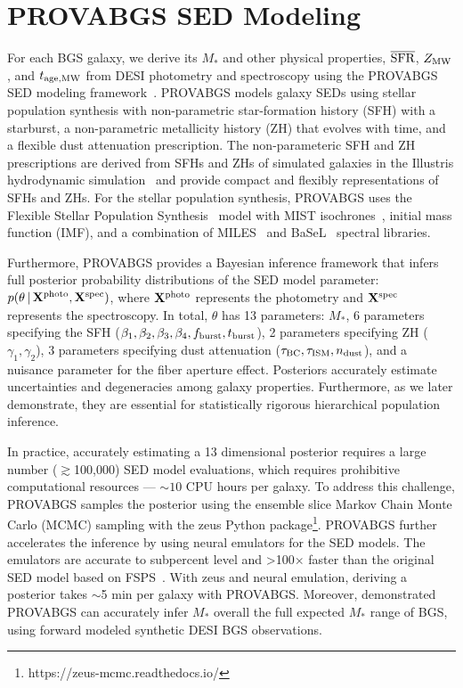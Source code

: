 \section{PROVABGS SED Modeling} \label{sec:provabgs}
For each BGS galaxy, we derive its $M_*$ and other physical properties, 
$\overline{\rm SFR}$, $Z_{\rm MW}$, and $t_{\rm age, MW}$ from DESI
photometry and spectroscopy using the PROVABGS SED modeling
framework~\citep{hahn2022}.  
PROVABGS models galaxy SEDs using stellar population synthesis with
non-parametric star-formation history (SFH) with a starburst, a non-parametric
metallicity history (ZH) that evolves with time, and a flexible dust
attenuation prescription.
The non-parameteric SFH and ZH prescriptions are derived from SFHs and ZHs of
simulated galaxies in the Illustris hydrodynamic
simulation~\citep{vogelsberger2014, genel2014, nelson2015} and provide compact 
and flexibly representations of SFHs and ZHs.
For the stellar population synthesis, PROVABGS uses the Flexible Stellar
Population Synthesis~\citep[FSPS;][]{conroy2009, conroy2010b} model with MIST
isochrones~\citep{paxton2011, paxton2013, paxton2015, choi2016, dotter2016},
\cite{chabrier2003} initial mass function (IMF), and a combination of
MILES~\citep{sanchez-blazquez2006} and BaSeL~\citep{lejeune1997, lejeune1998,
westera2002} spectral libraries.

Furthermore, PROVABGS provides a Bayesian inference framework that infers
full posterior probability distributions of the SED model parameter:
$p(\theta\,|\, {\bf X}^{\rm photo}, {\bf X}^{\rm spec})$, where 
${\bf X}^{\rm photo}$ represents the photometry and ${\bf X}^{\rm spec}$ 
represents the spectroscopy. 
In total, $\theta$ has 13 parameters: $M_*$, 6 parameters specifying the SFH
($\beta_1, \beta_2, \beta_3, \beta_4, f_{\rm burst}, t_{\rm burst}$), 2
parameters specifying ZH ($\gamma_1, \gamma_2$), 3 parameters specifying
dust attenuation ($\tau_{\rm BC}, \tau_{\rm ISM}, n_{\rm dust}$), and a
nuisance parameter for the fiber aperture effect. 
Posteriors accurately estimate uncertainties and degeneracies among galaxy
properties. 
Furthermore, as we later demonstrate, they are essential for statistically
rigorous hierarchical population inference.

In practice, accurately estimating a 13 dimensional posterior requires a large
number ($\gtrsim$100,000) SED model evaluations, which requires prohibitive
computational resources --- $\sim 10$ CPU hours per galaxy. 
To address this challenge, PROVABGS samples the posterior using the
\cite{karamanis2020} ensemble slice Markov Chain Monte Carlo (MCMC) sampling
with the {\sc zeus} Python package\footnote{https://zeus-mcmc.readthedocs.io/}.
PROVABGS further accelerates the inference by using neural emulators for the
SED models. 
The emulators are accurate to subpercent level and >100$\times$ faster than the
original SED model based on FSPS~\citep{kwon2022}. 
With {\sc zeus} and neural emulation, deriving a posterior takes $\sim$5 min
per galaxy with PROVABGS.
Moreover, \cite{hahn2022} demonstrated PROVABGS can accurately infer $M_*$
overall the full expected $M_*$ range of BGS, using forward modeled synthetic
DESI BGS observations. 

